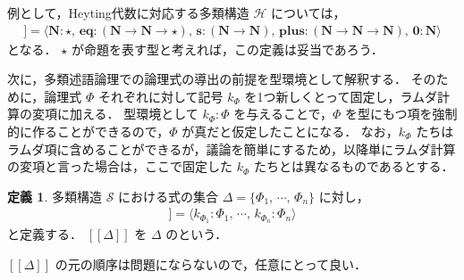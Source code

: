 \documentclass[./main]{subfiles}
\newcommand{\bto}{\mathbin{\to}}
\newcommand{\ocl}{\mathord{:}}
\newcommand{\comb}[1]{\mathbf{#1}}
\newcommand{\typstar}{\mathord{\star}}
\newcommand{\textem}[1]{\textbf{\textgt{#1}}}
\newcommand{\mathscr}[1]{\mathcal{#1}}
\newcommand{\fl}[1]{}
\newcommand{\fcdots}{\mathord{\cdots}}
\newcommand{\ats}{\,}
\newcommand{\llbracket}{[\![}
\newcommand{\rrbracket}{]\!]}
\theoremstyle{definition}
\newtheorem{defi}[theo]{定義}
\begin{document}
例として，Heyting代数に対応する多類構造 $ \mathscr{H} $ については，
\begin{gather*}
\llbracket \mathscr{H} \rrbracket = \langle \comb{N} \ocl\, \typstar,\ats \comb{eq} \ocl\, (\comb{N} \bto \comb{N} \bto \typstar),\ats \comb{s} \ocl\, (\comb{N} \bto \comb{N}),\ats \comb{plus} \ocl\, (\comb{N} \bto \comb{N} \bto \comb{N}),\ats \comb{0} \ocl\, \comb{N} \rangle
\end{gather*}
となる．
$ \typstar $ が命題を表す型と考えれば，この定義は妥当であろう．

次に，多類述語論理での論理式の導出の前提を型環境として解釈する．
そのために，論理式 $ \varPhi $ それぞれに対して記号 $ k _\varPhi $ を1つ新しくとって固定し，ラムダ計算の変項に加える．
型環境として $ k _\varPhi \ocl\, \varPhi $ を与えることで，$ \varPhi $ を型にもつ項を強制的に作ることができるので，$ \varPhi $ が真だと仮定したことになる．
なお，$ k _\varPhi $ たちはラムダ項に含めることができるが，議論を簡単にするため，以降単にラムダ計算の変項と言った場合は，ここで固定した $ k _\varPhi $ たちとは異なるものであるとする．

\begin{defi}
多類構造 $ \mathscr{S} $ における式の集合 $ \varDelta = \{ \varPhi _1,\ats \fcdots,\ats \varPhi _n \} $ に対し，
\begin{gather*}
\llbracket \varDelta \rrbracket = \langle k _{\varPhi _1} \ocl\, \varPhi _1,\ats \fcdots,\ats k _{\varPhi _n} \ocl\, \varPhi _n \rangle
\end{gather*}
と定義する．
$ \llbracket \varDelta \rrbracket $ を $ \varDelta $ の\textem{標準環境\fl{canonical context}}という．
\end{defi}

$ \llbracket \varDelta \rrbracket $ の元の順序は問題にならないので，任意にとって良い．
\end{document}

